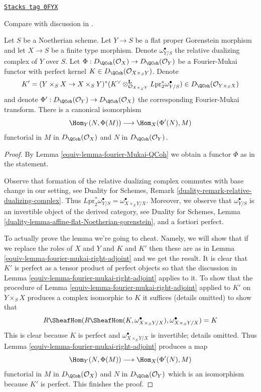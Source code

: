 \begin{lemma}
\label{equiv-lemma-fourier-mukai-left-adjoint}
\href{https://stacks.math.columbia.edu/tag/0FYX}{\texttt{Stacks tag 0FYX}}

\begin{reference}
Compare with discussion in \cite{Rizzardo}.
\end{reference}
Let $S$ be a Noetherian scheme. Let $Y \to S$ be a flat proper
Gorenstein morphism and let $X \to S$ be a finite type morphism.
Denote $\omega^\bullet_{Y/S}$ the relative dualizing complex of
$Y$ over $S$. Let $\Phi : D_\QCoh(\mathcal{O}_X) \to D_\QCoh(\mathcal{O}_Y)$
be a Fourier-Mukai functor with perfect kernel
$K \in D_\QCoh(\mathcal{O}_{X \times_S Y})$. Denote
$$
K' = (Y \times_S X \to X \times_S Y)^*(K^\vee
\otimes_{\mathcal{O}_{X \times_S Y}}^\mathbf{L}
L\text{pr}_2^*\omega^\bullet_{Y/S})
\in
D_\QCoh(\mathcal{O}_{Y \times_S X})
$$
and denote $\Phi' : D_\QCoh(\mathcal{O}_Y) \to D_\QCoh(\mathcal{O}_X)$
the corresponding Fourier-Mukai transform. There is a canonical
isomorphism
$$
\Hom_Y(N, \Phi(M)) \longrightarrow \Hom_X(\Phi'(N), M)
$$
functorial in $M$ in $D_\QCoh(\mathcal{O}_X)$ and $N$ in
$D_\QCoh(\mathcal{O}_Y)$.
\end{lemma}

\begin{proof}

By Lemma \ref{equiv-lemma-fourier-Mukai-QCoh} we obtain a functor $\Phi$
as in the statement.

\medskip\noindent
Observe that formation of the relative dualizing complex commutes
with base change in our setting, see Duality for Schemes,
Remark \ref{duality-remark-relative-dualizing-complex}.
Thus $L\text{pr}_2^*\omega^\bullet_{Y/S} = \omega^\bullet_{X \times_S Y/X}$.
Moreover, we observe that $\omega^\bullet_{Y/S}$ is an
invertible object of the derived category, see Duality for Schemes, Lemma
\ref{duality-lemma-affine-flat-Noetherian-gorenstein}, and a fortiori
perfect.

\medskip\noindent
To actually prove the lemma we're going to cheat. Namely, we will
show that if we replace the roles of $X$ and $Y$ and $K$ and $K'$
then these are as in Lemma \ref{equiv-lemma-fourier-mukai-right-adjoint}
and we get the result. It is clear that $K'$ is perfect as a
tensor product of perfect objects so that the discussion in
Lemma \ref{equiv-lemma-fourier-mukai-right-adjoint} applies to it.
To show that the procedure of
Lemma \ref{equiv-lemma-fourier-mukai-right-adjoint} applied to $K'$
on $Y \times_S X$ produces a complex isomorphic to $K$ it suffices
(details omitted) to show that
$$
R\SheafHom(R\SheafHom(K, \omega^\bullet_{X \times_S Y/X}),
\omega^\bullet_{X \times_S Y/X}) = K
$$
This is clear because $K$ is perfect and $\omega^\bullet_{X \times_S Y/X}$
is invertible; details omitted. Thus
Lemma \ref{equiv-lemma-fourier-mukai-right-adjoint} produces a map
$$
\Hom_Y(N, \Phi(M)) \longrightarrow \Hom_X(\Phi'(N), M)
$$
functorial in $M$ in $D_\QCoh(\mathcal{O}_X)$ and $N$ in
$D_\QCoh(\mathcal{O}_Y)$ which is an isomorphism because
$K'$ is perfect. This finishes the proof.
\end{proof}

